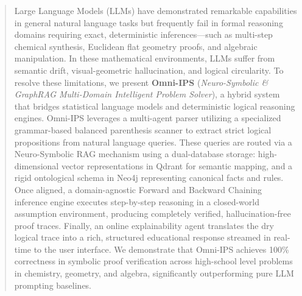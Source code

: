 \begin{abstract}
Large Language Models (LLMs) have demonstrated remarkable capabilities in general natural language tasks but frequently fail in formal reasoning domains requiring exact, deterministic inferences—such as multi-step chemical synthesis, Euclidean flat geometry proofs, and algebraic manipulation. In these mathematical environments, LLMs suffer from semantic drift, visual-geometric hallucination, and logical circularity. To resolve these limitations, we present \textbf{Omni-IPS} (\textit{Neuro-Symbolic \& GraphRAG Multi-Domain Intelligent Problem Solver}), a hybrid system that bridges statistical language models and deterministic logical reasoning engines. Omni-IPS leverages a multi-agent parser utilizing a specialized grammar-based balanced parenthesis scanner to extract strict logical propositions from natural language queries. These queries are routed via a Neuro-Symbolic RAG mechanism using a dual-database storage: high-dimensional vector representations in Qdrant for semantic mapping, and a rigid ontological schema in Neo4j representing canonical facts and rules. Once aligned, a domain-agnostic Forward and Backward Chaining inference engine executes step-by-step reasoning in a closed-world assumption environment, producing completely verified, hallucination-free proof traces. Finally, an online explainability agent translates the dry logical trace into a rich, structured educational response streamed in real-time to the user interface. We demonstrate that Omni-IPS achieves 100\% correctness in symbolic proof verification across high-school level problems in chemistry, geometry, and algebra, significantly outperforming pure LLM prompting baselines.
\end{abstract}

